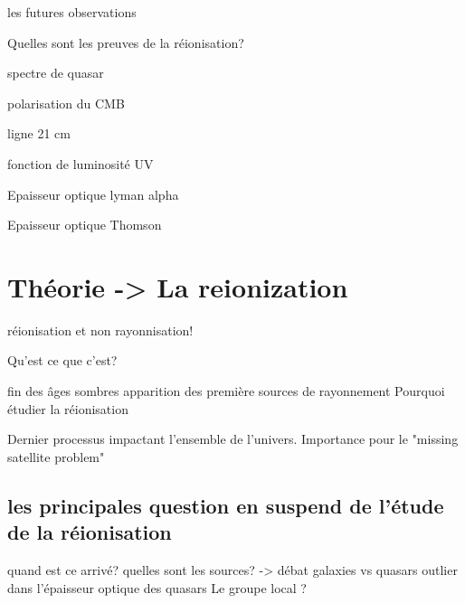 les futures observations

Quelles sont les preuves de la réionisation?

spectre de quasar

polarisation du CMB

ligne 21 cm

fonction de luminosité UV

Epaisseur optique lyman alpha

Epaisseur optique Thomson

\section{Théorie -> La reionization}

réionisation et non rayonnisation!

Qu'est ce que c'est?

fin des âges sombres
apparition des première sources de rayonnement
Pourquoi étudier la réionisation

Dernier processus impactant l'ensemble de l'univers.
Importance pour le "missing satellite problem"

\subsection{les principales question en suspend de l'étude de la réionisation}

quand est ce arrivé?
quelles sont les sources? -> débat galaxies vs quasars
outlier dans l'épaisseur optique des quasars
Le groupe local ?


